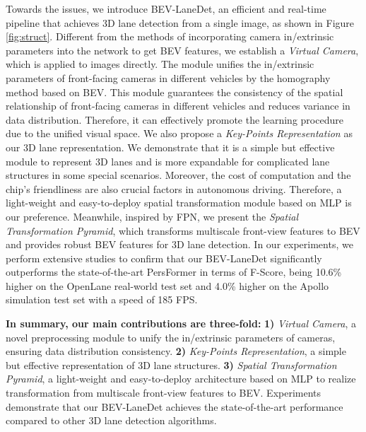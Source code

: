 \documentclass[10pt,twocolumn,letterpaper]{article}
\begin{document}
Towards the issues, we introduce BEV-LaneDet, an efficient and real-time pipeline that achieves 3D lane detection from a single image, as shown in Figure \ref{fig:struct}. Different from the methods of incorporating camera in/extrinsic parameters into the network to get BEV features, we establish a \textit{Virtual Camera}, which is applied to images directly. The module unifies the in/extrinsic parameters of front-facing cameras in different vehicles by the homography method\cite{homographies} based on BEV. This module guarantees the consistency of the spatial relationship of front-facing cameras in different vehicles and reduces variance in data distribution. Therefore, it can effectively promote the learning procedure due to the unified visual space. We also propose a \textit{Key-Points Representation} as our 3D lane representation. We demonstrate that it is a simple but effective module to represent 3D lanes and is more expandable for complicated lane structures in some special scenarios. Moreover, the cost of computation and the chip's friendliness are also crucial factors in autonomous driving. Therefore, a light-weight and easy-to-deploy spatial transformation module based on MLP is our preference. Meanwhile, inspired by FPN\cite{lin2017feature}, we present the \textit{Spatial Transformation Pyramid}, which transforms multiscale front-view features to BEV and provides robust BEV features for 3D lane detection. In our experiments, we perform extensive studies to confirm that our BEV-LaneDet significantly outperforms the state-of-the-art PersFormer \cite{chen2022persformer} in terms of F-Score, being 10.6\% higher on the OpenLane real-world test set \cite{chen2022persformer}  and 4.0\% higher on the Apollo simulation test set \cite{guo2020gen} with a speed of 185 FPS.



\textbf{In summary, our main contributions are three-fold:} \textbf{1)} \textit{Virtual Camera}, a novel preprocessing module to unify the in/extrinsic parameters of cameras, ensuring data distribution consistency. \textbf{2)} \textit{Key-Points Representation}, a simple but effective representation of 3D lane structures. \textbf{3)} \textit{Spatial Transformation Pyramid}, a light-weight and easy-to-deploy architecture based on MLP to realize transformation from multiscale front-view features to BEV. Experiments demonstrate that our BEV-LaneDet achieves the state-of-the-art performance compared to other 3D lane detection algorithms.
%
 
\end{document}
